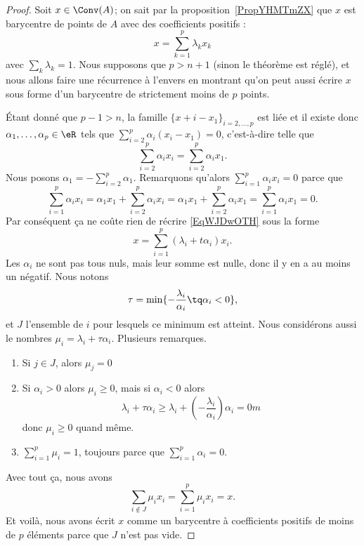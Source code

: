 \begin{proof}
    Soit \( x\in\Conv(A)\); on sait par la proposition~\ref{PropYHMTmZX} que \( x\) est barycentre de points de \( A\) avec des coefficients positifs :
    \begin{equation}    \label{EqWJDwOTH}
        x=\sum_{k=1}^p\lambda_kx_k
    \end{equation}
    avec \( \sum_k\lambda_k=1\). Nous supposons que \( p>n+1\) (sinon le théorème est réglé), et nous allons faire une récurrence à l'envers en montrant qu'on peut aussi écrire \( x\) sous forme d'un barycentre de strictement moins de \( p\) points.

    Étant donné que \( p-1>n\), la famille \( \{ x+i-x_1 \}_{i=2,\ldots, p}\) est liée et il existe donc \( \alpha_1,\ldots, \alpha_p\in \eR\) tels que \( \sum_{i=2}^p\alpha_i(x_i-x_1)=0\), c'est-à-dire telle que
    \begin{equation}
        \sum_{i=2}^p\alpha_ix_i=\sum_{i=2}^p\alpha_ix_1.
    \end{equation}
    Nous posons \( \alpha_1=-\sum_{i=2}^p\alpha_1\). Remarquons qu'alors \( \sum_{i=1}^p\alpha_ix_i=0\) parce que
    \begin{equation}
        \sum_{i=1}^p\alpha_ix_i=\alpha_1x_1+\sum_{i=2}^p\alpha_ix_i=\alpha_1x_1+\sum_{i=2}^p\alpha_ix_1=\sum_{i=1}^p\alpha_ix_1=0.
    \end{equation}
    Par conséquent ça ne coûte rien de récrire \eqref{EqWJDwOTH} sous la forme
    \begin{equation}
        x=\sum_{i=1}^p(\lambda_i+t\alpha_i)x_i.
    \end{equation}
    Les \( \alpha_i\) ne sont pas tous nuls, mais leur somme est nulle, donc il y en a au moins un négatif. Nous notons
    \begin{equation}
        \tau=\min\{ -\frac{ \lambda_i }{ \alpha_i }\tq \alpha_i<0 \},
    \end{equation}
    et \( J\) l'ensemble de \( i\) pour lesquels ce minimum est atteint. Nous considérons aussi le nombres \( \mu_i=\lambda_i+\tau\alpha_i\). Plusieurs remarques.
    \begin{enumerate}
        \item
            Si \( j\in J\), alors \( \mu_j=0\)
        \item
            Si \( \alpha_i>0\) alors \( \mu_i\geq 0\), mais si \( \alpha_i<0\) alors
            \begin{equation}
                \lambda_i+\tau\alpha_i\geq \lambda_i+(-\frac{ \lambda_i }{ \alpha_i })\alpha_i=0m
            \end{equation}
            donc \( \mu_i\geq 0\) quand même.
        \item
            \( \sum_{i=1}^p\mu_i=1\), toujours parce que \( \sum_{i=1}^p\alpha_i=0\).
    \end{enumerate}
    Avec tout ça, nous avons
    \begin{equation}
        \sum_{i\notin J}\mu_ix_i=\sum_{i=1}^p\mu_ix_i=x.
    \end{equation}
    Et voilà, nous avons écrit \( x\) comme un barycentre à coefficients positifs de moins de \( p\) éléments parce que \( J\) n'est pas vide.
\end{proof}


